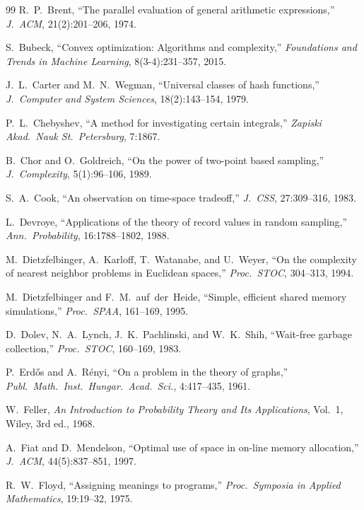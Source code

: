 \documentclass[twoside,12pt]{book}
\theoremstyle{plain}
\theoremstyle{definition}
\theoremstyle{remark}
\begin{document}
\begin{thebibliography}{99}
R.~P.~Brent,
``The parallel evaluation of general arithmetic expressions,''
\textit{J.~ACM}, 21(2):201--206, 1974.

S.~Bubeck,
``Convex optimization: Algorithms and complexity,''
\textit{Foundations and Trends in Machine Learning}, 8(3-4):231--357, 2015.

J.~L.~Carter and M.~N.~Wegman,
``Universal classes of hash functions,''
\textit{J.~Computer and System Sciences}, 18(2):143--154, 1979.

P.~L.~Chebyshev,
``A method for investigating certain integrals,''
\textit{Zapiski Akad.~Nauk St.~Petersburg}, 7:1867.

B.~Chor and O.~Goldreich,
``On the power of two-point based sampling,''
\textit{J.~Complexity}, 5(1):96--106, 1989.

S.~A.~Cook,
``An observation on time-space tradeoff,''
\textit{J.~CSS}, 27:309--316, 1983.

L.~Devroye,
``Applications of the theory of record values in random sampling,''
\textit{Ann.~Probability}, 16:1788--1802, 1988.

M.~Dietzfelbinger, A.~Karloff, T.~Watanabe, and U.~Weyer,
``On the complexity of nearest neighbor problems in Euclidean spaces,''
\textit{Proc.~STOC}, 304--313, 1994.

M.~Dietzfelbinger and F.~M.~auf~der~Heide,
``Simple, efficient shared memory simulations,''
\textit{Proc.~SPAA}, 161--169, 1995.

D.~Dolev, N.~A.~Lynch, J.~K.~Pachlinski, and W.~K.~Shih,
``Wait-free garbage collection,''
\textit{Proc.~STOC}, 160--169, 1983.

P.~Erd\H{o}s and A.~R\'{e}nyi,
``On a problem in the theory of graphs,''
\textit{Publ.~Math.~Inst.~Hungar.~Acad.~Sci.}, 4:417--435, 1961.

W.~Feller,
\textit{An Introduction to Probability Theory and Its Applications}, Vol.~1,
Wiley, 3rd ed., 1968.

A.~Fiat and D.~Mendelson,
``Optimal use of space in on-line memory allocation,''
\textit{J.~ACM}, 44(5):837--851, 1997.

R.~W.~Floyd,
``Assigning meanings to programs,''
\textit{Proc.~Symposia in Applied Mathematics}, 19:19--32, 1975.


\end{thebibliography}
\end{document}
